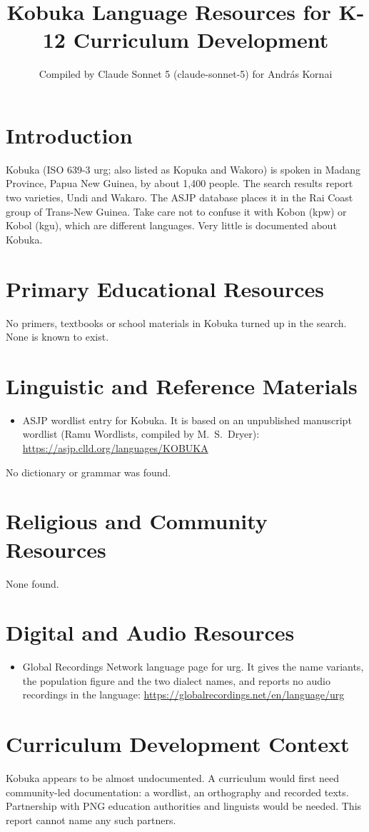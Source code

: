 \documentclass[12pt]{article}
\title{Kobuka Language Resources for K-12 Curriculum Development}
\author{Compiled by Claude Sonnet 5 (claude-sonnet-5) for Andr\'as Kornai}
\date{}
\begin{document}
\maketitle

\section{Introduction}
Kobuka (ISO 639-3 urg; also listed as Kopuka and Wakoro) is spoken in Madang Province, Papua New Guinea, by about 1,400 people. The search results report two varieties, Undi and Wakaro. The ASJP database places it in the Rai Coast group of Trans-New Guinea. Take care not to confuse it with Kobon (kpw) or Kobol (kgu), which are different languages. Very little is documented about Kobuka.

\section{Primary Educational Resources}
No primers, textbooks or school materials in Kobuka turned up in the search. None is known to exist.

\section{Linguistic and Reference Materials}
\begin{itemize}
\item ASJP wordlist entry for Kobuka. It is based on an unpublished manuscript wordlist (Ramu Wordlists, compiled by M.\ S.\ Dryer): \url{https://asjp.clld.org/languages/KOBUKA}
\end{itemize}
No dictionary or grammar was found.

\section{Religious and Community Resources}
None found.

\section{Digital and Audio Resources}
\begin{itemize}
\item Global Recordings Network language page for urg. It gives the name variants, the population figure and the two dialect names, and reports no audio recordings in the language: \url{https://globalrecordings.net/en/language/urg}
\end{itemize}

\section{Curriculum Development Context}
Kobuka appears to be almost undocumented. A curriculum would first need community-led documentation: a wordlist, an orthography and recorded texts. Partnership with PNG education authorities and linguists would be needed. This report cannot name any such partners.
\end{document}
